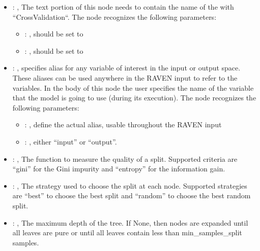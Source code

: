 \begin{itemize}
    \item {}: , 
      The text portion of this node needs to contain the name of the  with
               ``CrossValidation``.
      The  node recognizes the following parameters:
        \begin{itemize}
          \item {}: , 
            should be set to 
          \item {}: , 
            should be set to 
      \end{itemize}

    \item {}: , 
      specifies alias for         any variable of interest in the input or output space. These
      aliases can be used anywhere in the RAVEN input to         refer to the variables. In the body
      of this node the user specifies the name of the variable that the model is going to use
      (during its execution).
      The  node recognizes the following parameters:
        \begin{itemize}
          \item {}: , 
            define the actual alias, usable throughout the RAVEN input
          \item {}: , 
            either ``input'' or ``output''.
      \end{itemize}

    \item {}: , 
      The function to measure the quality of a split. Supported criteria are ``gini'' for the
      Gini impurity and ``entropy'' for the information gain.

    \item {}: , 
      The strategy used to choose the split at each node. Supported strategies are ``best''
      to choose the best split and ``random'' to choose the best random split.

    \item {}: , 
      The maximum depth of the tree. If None, then nodes are expanded until all leaves are pure
      or until all leaves contain less than min\_samples\_split samples.


\end{itemize}
